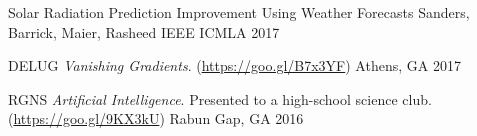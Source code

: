 
\begin{cvhonors}

\cvhonor
{Solar Radiation Prediction Improvement Using Weather Forecasts}
{Sanders, Barrick, Maier, Rasheed}
{IEEE ICMLA}
{2017}

\end{cvhonors}


\begin{cvhonors}

\cvhonor
{DELUG}
{\textit{Vanishing Gradients}. (\url{https://goo.gl/B7x3YF})}
{Athens, GA}
{2017}

\cvhonor
{RGNS}
{\textit{Artificial Intelligence}. Presented to a high-school science club. (\url{https://goo.gl/9KX3kU})}
{Rabun Gap, GA}
{2016}

\end{cvhonors}
